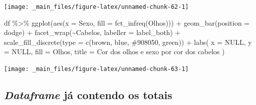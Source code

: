 \documentclass[
  11pt]{report}
\newenvironment{Shaded}{\begin{snugshade}}{\end{snugshade}}
\newcommand{\AttributeTok}[1]{\textcolor[rgb]{0.77,0.63,0.00}{#1}}
\newcommand{\ConstantTok}[1]{\textcolor[rgb]{0.00,0.00,0.00}{#1}}
\newcommand{\FunctionTok}[1]{\textcolor[rgb]{0.00,0.00,0.00}{#1}}
\newcommand{\NormalTok}[1]{#1}
\newcommand{\SpecialCharTok}[1]{\textcolor[rgb]{0.00,0.00,0.00}{#1}}
\newcommand{\StringTok}[1]{\textcolor[rgb]{0.31,0.60,0.02}{#1}}
\renewenvironment{Shaded}{
  \begin{mdframed}[%
    roundcorner=2pt,%
    innerleftmargin=5pt,%
    innerrightmargin=5pt,%
    topline=true,%
    leftline=true,%
    rightline=true,%
    bottomline=true,%
    linewidth=0.5pt,%
    linecolor=black!20,%
    backgroundcolor=black!2,%
    skipabove=2ex,%
    skipbelow=2.5ex%
  ]%
}
{
  \end{mdframed}
}
\begin{document}
\begin{center}\texttt{[image: \_main\_files/figure-latex/unnamed-chunk-62-1]} \end{center}

\begin{Shaded}
\begin{Highlighting}[]
\NormalTok{df }\SpecialCharTok{\%\textgreater{}\%} 
  \FunctionTok{ggplot}\NormalTok{(}\FunctionTok{aes}\NormalTok{(}\AttributeTok{x =}\NormalTok{ Sexo, }\AttributeTok{fill =} \FunctionTok{fct\_infreq}\NormalTok{(Olhos))) }\SpecialCharTok{+}
    \FunctionTok{geom\_bar}\NormalTok{(}\AttributeTok{position =} \StringTok{\textquotesingle{}dodge\textquotesingle{}}\NormalTok{) }\SpecialCharTok{+}
    \FunctionTok{facet\_wrap}\NormalTok{(}\SpecialCharTok{\textasciitilde{}}\NormalTok{Cabelos, }\AttributeTok{labeller =}\NormalTok{ label\_both) }\SpecialCharTok{+}
    \FunctionTok{scale\_fill\_discrete}\NormalTok{(}\AttributeTok{type =} \FunctionTok{c}\NormalTok{(}\StringTok{\textquotesingle{}brown\textquotesingle{}}\NormalTok{, }\StringTok{\textquotesingle{}blue\textquotesingle{}}\NormalTok{, }\StringTok{\textquotesingle{}\#908050\textquotesingle{}}\NormalTok{, }\StringTok{\textquotesingle{}green\textquotesingle{}}\NormalTok{)) }\SpecialCharTok{+}
    \FunctionTok{labs}\NormalTok{(}
      \AttributeTok{x =} \ConstantTok{NULL}\NormalTok{,}
      \AttributeTok{y =} \ConstantTok{NULL}\NormalTok{,}
      \AttributeTok{fill =} \StringTok{\textquotesingle{}Olhos\textquotesingle{}}\NormalTok{,}
      \AttributeTok{title =} \StringTok{\textquotesingle{}Cor dos olhos e sexo por cor dos cabelos\textquotesingle{}}
\NormalTok{    )}
\end{Highlighting}
\end{Shaded}

\begin{center}\texttt{[image: \_main\_files/figure-latex/unnamed-chunk-63-1]} \end{center}

\hypertarget{dataframe-juxe1-contendo-os-totais}{%
\subsection{\texorpdfstring{\emph{Dataframe} já contendo os totais}{Dataframe já contendo os totais}}\label{dataframe-juxe1-contendo-os-totais}}
\end{document}
